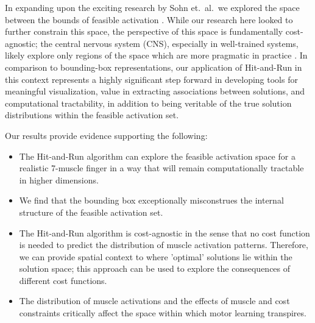 In expanding upon the exciting research by Sohn et.\ al.\, we explored the space between the bounds of feasible activation \cite{sohn2013cat_bounding_box}.
While our research here looked to further constrain this space, the perspective of this space is fundamentally cost-agnostic; the central nervous system (CNS), especially in well-trained systems, likely explore only regions of the space which are more pragmatic in practice \cite{todorov2002optimal}.
In comparison to bounding-box representations, our application of Hit-and-Run in this context represents a highly significant step forward in developing tools for meaningful visualization, value in extracting associations between solutions, and computational tractability, in addition to being veritable of the true solution distributions within the feasible activation set.

Our results provide evidence supporting the following:
\begin{itemize}
	\item{The Hit-and-Run algorithm can explore the feasible activation space for a realistic 7-muscle finger in a way that will remain computationally tractable in higher dimensions.}
	\item{We find that the bounding box exceptionally misconstrues the internal structure of the feasible activation set.}
	\item{The Hit-and-Run algorithm is cost-agnostic in the sense that no cost function is needed to predict the distribution of muscle activation patterns.
	Therefore, we can provide spatial context to where 'optimal' solutions lie within the solution space; this approach can be used to explore the consequences of different cost functions.}
	\item{The distribution of muscle activations and the effects of muscle and cost constraints critically affect the space within which motor learning transpires.}
\end{itemize}

